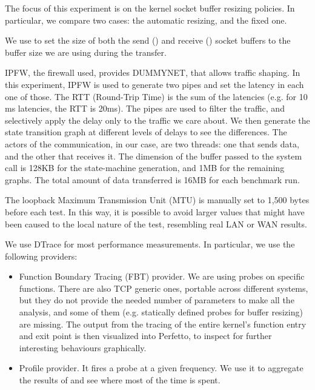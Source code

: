 \documentclass[a4paper,10pt]{article}
\begin{document}
The focus of this experiment is on the kernel socket buffer resizing policies. In particular, we compare two cases: the automatic resizing, and the fixed one.

We use  to set the size of both the send () and receive () socket buffers to the buffer size we are using during the transfer.

IPFW, the firewall used, provides DUMMYNET\cite{luigirizzo_luigirizzodummynet_2020}, that allows traffic shaping. In this experiment, IPFW is used to generate two pipes and set the latency in each one of those. The RTT (Round-Trip Time) is the sum of the latencies (e.g. for 10 ms latencies, the RTT is 20ms). The pipes are used to filter the traffic, and selectively apply the delay only to the traffic we care about. We then generate the state transition graph at different levels of delays to see the differences.
The actors of the communication, in our case, are two threads: one that sends data, and the other that receives it. The dimension of the buffer passed to the  system call is 128KB for the state-machine generation, and 1MB for the remaining graphs.
The total amount of data transferred is 16MB for each benchmark run.

The loopback Maximum Transmission Unit (MTU) is manually set to 1,500 bytes before each test. In this way, it is possible to avoid larger values that might have been caused to the local nature of the test, resembling real LAN or WAN results.

We use DTrace for most performance measurements. In particular, we use the following providers:

\begin{itemize}
   \item Function Boundary Tracing (FBT) provider. We are using probes on specific functions. There are also TCP generic ones, portable across different systems, but they do not provide the needed number of parameters to make all the analysis, and some of them (e.g. statically defined probes for buffer resizing) are missing. The output from the tracing of the entire kernel's function entry and exit point is then visualized into Perfetto\cite{noauthor_perfetto_nodate}, to inspect for further interesting behaviours graphically.
   \item Profile provider. It fires a probe at a given frequency. We use it to aggregate the results of  and see where most of the time is spent. 
\end{itemize}
\end{document}

